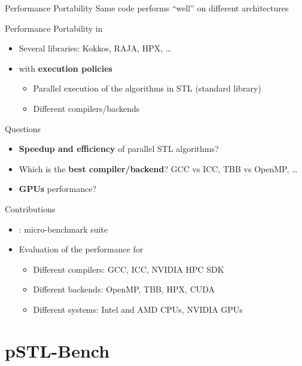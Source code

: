 \documentclass[aspectratio=169]{beamer}
\newenvironment{blockitem}[1]{\begin{block}{#1}\begin{itemize}}{\end{itemize}\end{block}}
\newenvironment{xframe}[1][]%
	{\begin{frame}[fragile, environment=xframe, #1]{\secname}}%
	{\end{frame}}
\begin{document}
\begin{xframe}
	\begin{block}{Performance Portability}
		Same code performs ``well'' on different architectures
	\end{block}
	\begin{blockitem}{Performance Portability in \langcpp}
		\item Several libraries: Kokkos, RAJA, HPX, \dots
		\item \textbf{\langcppsvtn} with \textbf{execution policies}
		\begin{itemize}
			\item Parallel execution of the algorithms in STL (standard library)
			\item Different compilers/backends
		\end{itemize}
	\end{blockitem}
\end{xframe}

\begin{xframe}
	\begin{blockitem}{Questions}
		\item \textbf{Speedup and efficiency} of parallel STL algorithms?
		\item Which is the \textbf{best compiler/backend}? GCC vs ICC, TBB vs OpenMP, \dots
		\item \textbf{GPUs} performance?
	\end{blockitem}
	\begin{blockitem}{Contributions}
		\item \pstlbench: micro-benchmark suite
		\item Evaluation of the performance for
		\begin{itemize}
			\item Different compilers: GCC, ICC, NVIDIA HPC SDK
			\item Different backends: OpenMP, TBB, HPX, CUDA
			\item Different systems: Intel and AMD CPUs, NVIDIA GPUs
		\end{itemize}
	\end{blockitem}
\end{xframe}

\section*{pSTL-Bench}
\end{document}
